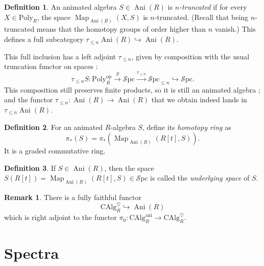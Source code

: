 \documentclass[11pt]{article}
\theoremstyle{definition}
\newtheorem{definition}{Definition}
\newtheorem{remark}{Remark}
\newcommand{\Ani}{\operatorname{Ani}}
\newcommand{\ani}{\mathrm{ani}}
\newcommand{\CAlg}{\mathrm{CAlg}}
\newcommand{\heart}{\heartsuit}
\newcommand{\Map}{\operatorname{Map}}
\newcommand{\op}{\mathrm{op}}
\newcommand{\Poly}{\mathrm{Poly}}
\newcommand{\Spc}{\mathcal{S}\mathrm{pc}}
\begin{document}
\begin{definition}
    An animated algebra $S \in \Ani(R)$ is \emph{$n$-truncated} if for every $X \in \Poly_R$, the space $\Map_{\Ani(R)}(X, S)$ is $n$-truncated. (Recall that being $n$-truncated means that the homotopy groups of order higher than $n$ vanish.)
    This defines a full subcategory $\tau_{\leqslant n} \Ani(R) \hookrightarrow \Ani(R)$.
\end{definition}
This full inclusion has a left adjoint $\tau_{\leqslant n}$, given by composition with the usual truncation functor on spaces :
\[
    \tau_{\leqslant n} S : \Poly_R^{\op} \xrightarrow{S} \Spc \xrightarrow{\tau_{\leqslant n}} \Spc_{\leqslant n} \hookrightarrow \Spc.
\]
This composition still preserves finite products, so it is still an animated algebra ; and the functor $\tau_{\leqslant n} : \Ani(R) \to \Ani(R)$ that we obtain indeed lands in $\tau_{\leqslant n}\Ani(R)$.

\begin{definition}
    For an animated $R$-algebra $S$, define its \emph{homotopy ring} as
    \[
        \pi_*(S) = \pi_*(\Map_{\Ani(R)}(R[t], S)).
    \]
    It is a graded commutative ring.
\end{definition}

\begin{definition}
    If $S \in \Ani(R)$, then the space $S(R[t]) = \Map_{\Ani(R)}(R[t], S) \in \Spc$ is called the \emph{underlying space} of $S$.
\end{definition}

\begin{remark}
    There is a fully faithful functor
    \[
        \CAlg_R^{\heart} \hookrightarrow \Ani(R)
    \]
    which is right adjoint to the functor $\pi_0 : \CAlg_R^{\ani} \to \CAlg_R^{\heart}$.
\end{remark}

\section{Spectra}
\end{document}
